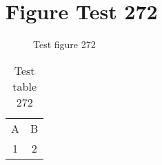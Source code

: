 \documentclass{article}
\begin{document}
\section{Figure Test 272}
\begin{figure}[h]
\caption{Test figure 272}
\end{figure}
\begin{table}[h]
\caption{Test table 272}
\begin{tabular}{cc}
A & B \\
1 & 2
\end{tabular}
\end{table}
\end{document}
